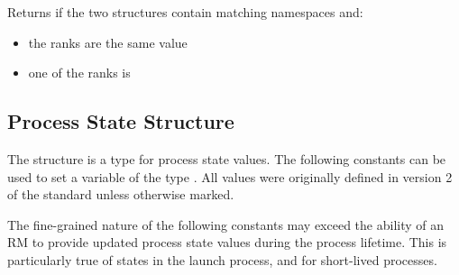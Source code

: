 Returns  if the two structures contain matching namespaces and:

\begin{itemize}
    \item the ranks are the same value
    \item one of the ranks is 
\end{itemize}


\subsection{Process State Structure}
\label{api:struct:processstate}

The  structure is a  type for process state values. The following constants can be used to set a variable of the type . All values were originally defined in version 2 of the standard unless otherwise marked.

\adviceuserstart
The fine-grained nature of the following constants may exceed the ability of an \ac{RM} to provide updated process state values during the process lifetime. This is particularly true of states in the launch process, and for short-lived processes.
\adviceuserend

